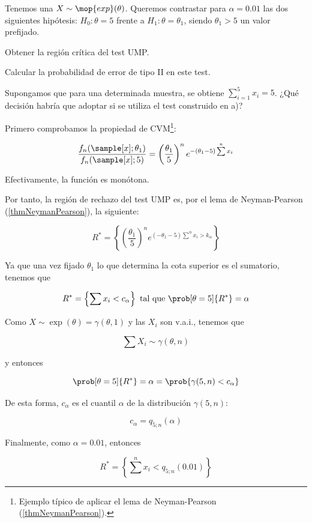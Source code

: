 \begin{problem}[1]
Tenemos una $X \sim \mop{exp}(\theta)$. Queremos contrastar para $\alpha = 0.01$ las dos siguientes hipótesis: $H_0: \theta = 5$ frente a $H_1: \theta = \theta_1$, siendo $\theta_1 > 5$ un valor prefijado.

\ppart Obtener la región crítica del test UMP.

\ppart Calcular la probabilidad de error de tipo II en este test.

\ppart Supongamos que para una determinada muestra, se obtiene $\sum_{i=1}^5 x_i= 5$. ¿Qué decisión habría que adoptar si se utiliza el test construido en a)?

\solution

\spart Primero comprobamos la propiedad de CVM\footnote{Ejemplo típico de aplicar el lema de Neyman-Pearson (\ref{thmNeymanPearson}).}:

\[ \frac{f_n(\sample[x];\theta_1)}{f_n(\sample[x];5)} = \left(\frac{\theta_1}{5}\right)^n e^{-(\theta_1 - 5)\sum\limits^n x_i} \]

Efectivamente, la función es monótona. %

Por tanto, la región de rechazo del test UMP es, por el lema de Neyman-Pearson (\ref{thmNeymanPearson}), la siguiente:

\[
R^{\ast} =
\left\{ \left(\frac{\theta_1}{5}\right)^n e^{(-\theta_1-5)\sum\limits^n x_i > k_\alpha}\right\}
\]

Ya que una vez fijado $\theta_1$ lo que determina la cota superior es el sumatorio, tenemos que

\[
R^{\ast} =
\left\{\sum x_i < c_{\alpha}\right\}
\text{ tal que }
\prob[\theta = 5]{ R^{\ast} } = \alpha
\]

Como $X \sim \exp(\theta) = \gamma(\theta, 1)$ y las $X_i$ son v.a.i., tenemos que 

\[ \sum X_i \sim \gamma(\theta, n) \]

y entonces

\[ \prob[\theta=5]{R^{\ast}} = \alpha = \prob{\gamma(5, n) < c_\alpha} \]

De esta forma, $c_\alpha$ es el cuantil $\alpha$ de la distribución $\gamma(5, n)$:

\[ c_\alpha = q_{5; n}(\alpha) \]

Finalmente, como $\alpha = 0.01 $, entonces

\[
R^{\ast} = \left\{ \sum\limits^n x_i < q_{5; n}(0.01) \right\}
\]


\end{problem}

